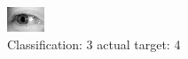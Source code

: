 \begin{figure}[h!]
\begin{center}
\includegraphics[width=0.60\columnwidth]{figures/ID3254_class_3_target_4.png}
\end{center}
\caption{ Classification: 3 actual target: 4}
\label{fig:ID3254_class_3_target_4}
\end{figure}
